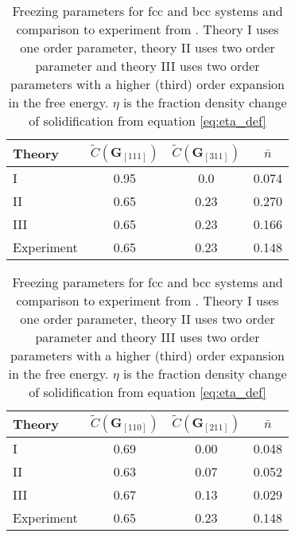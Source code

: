 \begin{table}[H]
    \begin{subtable}{0.4\linewidth}
        \centering
        \begin{tabular}{l c c c}
            \hline 
            Theory & $\tilde{C}(\mathbf{G}_{[111]})$ & $\tilde{C}(\mathbf{G}_{[311]})$ & $\bar{n}$ \\ 
            \hline
            I & 0.95 & 0.0 & 0.074 \\
            II & 0.65 & 0.23 & 0.270 \\
            III & 0.65 & 0.23 & 0.166 \\
            Experiment & 0.65 & 0.23 & 0.148\\
            \hline
        \end{tabular}
        \caption[Freezing parameters for Argon]{Freezing parameters for fcc with
            comparison to Argon experimental results.
        }\label{table:ramakrishnan_argon}
    \end{subtable}
    \hspace{0.10\linewidth}
    \begin{subtable}{0.4\linewidth}
        \centering
        \begin{tabular}{l c c c}
            \hline 
            Theory & $\tilde{C}(\mathbf{G}_{[110]})$ & $\tilde{C}(\mathbf{G}_{[211]})$ & $\bar{n}$ \\ 
            \hline
            I           & 0.69 & 0.00 & 0.048 \\
            II          & 0.63 & 0.07 & 0.052 \\
            III         & 0.67 & 0.13 & 0.029 \\
            Experiment  & 0.65 & 0.23 & 0.148\\
            \hline
        \end{tabular}
        \caption[Freezing parameters for Sodium]{Freezing parameter for bcc with 
            comparison to Sodium experimental results.
        }\label{table:ramakrishnan_sodium}
    \end{subtable}
    \caption[Table of Ramakrishnan results]{Freezing parameters for fcc and
        bcc systems and comparison to experiment from \cite{RAMAKRISHNAN79}.
        Theory I uses one order parameter, theory II uses two order parameter
        and theory III uses two order parameters with a higher (third) order
        expansion in the free energy. $\eta$ is the fraction density change of
        solidification from equation \ref{eq:eta_def}
    }
\end{table}

